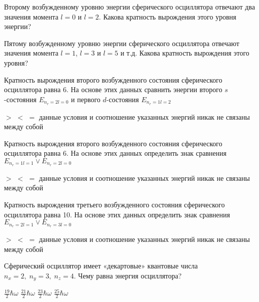 \documentclass[11pt,a4paper]{exam}
\begin{document}
\begin{questions}
\question Второму возбужденному уровню энергии сферического осциллятора отвечают два значения момента $l = 0$ и $l = 2$. Какова кратность вырождения этого уровня энергии?
\begin{choices}
\end{choices}

\question Пятому возбужденному уровню энергии сферического осциллятора отвечают значения момента $l = 1$, $l = 3$ и $l = 5$ и т.д. Какова кратность вырождения этого уровня?
\begin{choices}
\end{choices}

\question  Кратность вырождения второго возбужденного состояния сферического осциллятора равна 6. На основе этих данных сравнить энергии второго $s$-состояния ${E_{{n_r} = 2l = 0}}$ и первого $d$-состояния ${E_{{n_r} = 1l = 2}}$
\begin{choices}
\choice $ > $
\choice $ < $
\choice $ = $
\choice данные условия и соотношение указанных энергий никак не связаны между собой
\end{choices}

\question Кратность вырождения второго возбужденного состояния сферического осциллятора равна 6. На основе этих данных определить знак сравнения ${E_{{n_r} = 1l = 1}} \vee {E_{{n_r} = 2l = 0}}$ 
\begin{choices}
\choice $ > $
\choice $ < $
\choice $ = $
\choice данные условия и соотношение указанных энергий никак не связаны между собой
\end{choices}

\question Кратность вырождения третьего возбужденного состояния сферического осциллятора равна 10. На основе этих данных определить знак сравнения ${E_{{n_r} = 2l = 1}} \vee {E_{{n_r} = 3l = 0}}$ 
\begin{choices}
\choice $ > $
\choice $ < $
\choice $ = $
\choice данные условия и соотношение указанных энергий никак не связаны между собой
\end{choices}

\question Сферический осциллятор имеет «декартовые» квантовые числа ${n_x} = 2,\;{n_y} = 3,\;{n_z} = 4$. Чему равна энергия осциллятора?
\begin{choices}
\choice $\frac{{19}}{2}\hbar \omega $    
\choice $\frac{{21}}{2}\hbar \omega $    
\choice $\frac{{23}}{2}\hbar \omega $    
\choice $\frac{{25}}{2}\hbar \omega $
\end{choices}


\end{questions}
\end{document}
